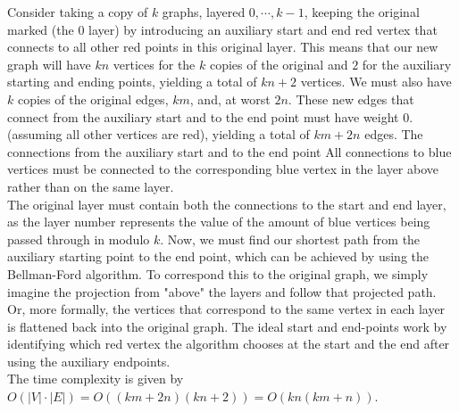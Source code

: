 \documentclass{article}
\begin{document}
\begin{solution}
Consider taking a copy of $k$ graphs, layered $0, \cdots, k-1$, keeping the original marked (the $0$ layer) by introducing an auxiliary start and end red vertex that connects to all other red points in this original layer. This means that our new graph will have $kn$ vertices for the $k$ copies of the original and $2$ for the auxiliary starting and ending points, yielding a total of $kn + 2$ vertices. We must also have $k$ copies of the original edges, $km$, and, at worst $2n$. These new edges that connect from the auxiliary start and to the end point must have weight 0. (assuming all other vertices are red), yielding a total of $km + 2n$ edges. The connections from the auxiliary start and to the end point All connections to blue vertices must be connected to the corresponding blue vertex in the layer above rather than on the same layer.\\

The original layer must contain both the connections to the start and end layer, as the layer number represents the value of the amount of blue vertices being passed through in modulo $k$. Now, we must find our shortest path from the auxiliary starting point to the end point, which can be achieved by using the Bellman-Ford algorithm. To correspond this to the original graph, we simply imagine the projection from "above" the layers and follow that projected path. Or, more formally, the vertices that correspond to the same vertex in each layer is flattened back into the original graph. The ideal start and end-points work by identifying which red vertex the algorithm chooses at the start and the end after using the auxiliary endpoints.\\

The time complexity is given by $O(|V|\cdot|E|) = O((km+2n)(kn+2)) = O(kn(km+n))$.
\end{solution}
\end{document}
